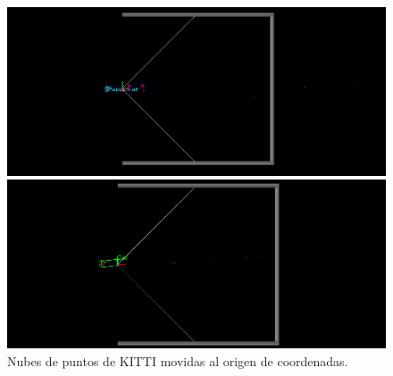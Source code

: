 \begin{figure}[H]
	\begin{minipage}{0.495\textwidth}
		\centering
		\includegraphics[width=1\linewidth]{Book/figures/7_roi/kitti_pcl_mov_0.png}
	\end{minipage}\hfill
	\begin{minipage}{0.495\textwidth}
		\centering
		\includegraphics[width=1\linewidth]{Book/figures/7_roi/kitti_pcl_mov_2.png}
	\end{minipage}
	\caption{Nubes de puntos de KITTI movidas al origen de coordenadas.}
	\label{fig:Nubes de puntos de KITTI movidas al origen de coordenadas.}
\end{figure}


